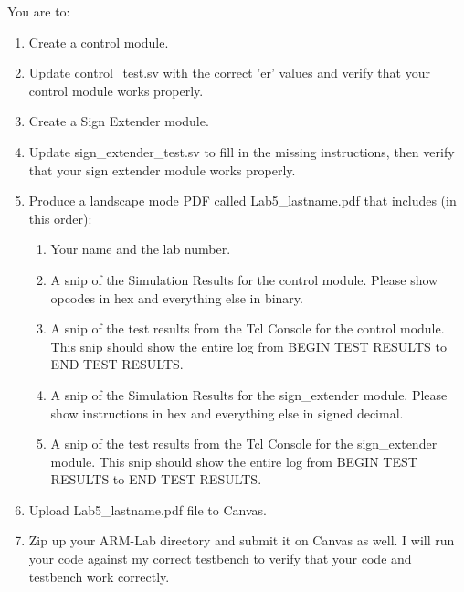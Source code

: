 You are to:
\begin{enumerate}
\item Create a control module.
\item Update control\_test.sv with the correct 'er' values and verify that your control module works properly.
\item Create a Sign Extender module.
\item Update sign\_extender\_test.sv to fill in the missing instructions, then verify that your sign extender module works properly.
\item Produce a landscape mode PDF called Lab5\_lastname.pdf that includes (in this order):
\begin{enumerate}
	\item Your name and the lab number.
	\item A snip of the Simulation Results for the control module.  Please show opcodes in hex and everything else in binary.  
	\item A snip of the test results from the Tcl Console for the control module.  This snip should show the entire log from BEGIN TEST RESULTS to END TEST RESULTS.
	\item A snip of the Simulation Results for the sign\_extender module.  Please show instructions in hex and everything else in signed decimal.  
	\item A snip of the test results from the Tcl Console for the sign\_extender module.  This snip should show the entire log from BEGIN TEST RESULTS to END TEST RESULTS.	
\end{enumerate}
\item Upload Lab5\_lastname.pdf file to Canvas.
\item Zip up your ARM-Lab directory and submit it on Canvas as well.  I will run your code against my correct testbench to verify that your code and testbench work correctly.
\end{enumerate} 